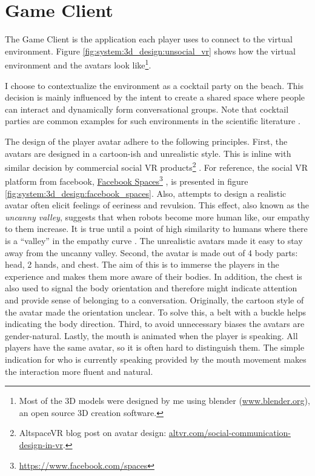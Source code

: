 \documentclass[]{simple-thesis}
\newcommand\fnurl[2]{%
  \href{#2}{#1}\footnote{\url{#2}}%
}
\begin{document}
\section{Game Client}

The Game Client is the application each player uses to connect to the virtual environment.
Figure \ref{fig:system:3d_design:unsocial_vr} shows how the virtual environment and the avatars look like\footnote{Most of the 3D models were designed by me using blender (\href{https://www.blender.org/}{www.blender.org}), an open source 3D creation software.}.

I choose to contextualize the environment as a cocktail party on the beach.
This decision is mainly influenced by the intent to create a shared space where people can interact and dynamically form conversational groups.
Note that cocktail parties are common examples for such environments in the scientific literature \citep{Setti2015}.

The design of the player avatar adhere to the following principles.
First, the avatars are designed in a cartoon-ish and unrealistic style.
This is inline with similar decision by commercial social VR products\footnote{AltspaceVR blog post on avatar design: \href{https://altvr.com/social-communication-design-in-vr/}{altvr.com/social-communication-design-in-vr}.} \citep{Ghosh2017, Pot2016}.
For reference, the social VR platform from facebook, \fnurl{Facebook Spaces}{https://www.facebook.com/spaces}, is presented in figure \ref{fig:system:3d_design:facebook_spaces}.
Also, attempts to design a realistic avatar often elicit feelings of eeriness and revulsion.
This effect, also known as the \textit{uncanny valley}, suggests that when robots become more human like, our empathy to them increase.
It is true until a point of high similarity to humans where there is a ``valley'' in the empathy curve \citep{Mori1970}.
The unrealistic avatars made it easy to stay away from the uncanny valley.
Second, the avatar is made out of 4 body parts: head, 2 hands, and chest.
The aim of this is to immerse the players in the experience and makes them more aware of their bodies.
In addition, the chest is also used to signal the body orientation and therefore might indicate attention and provide sense of belonging to a conversation.
Originally, the cartoon style of the avatar made the orientation unclear.
To solve this, a belt with a buckle helps indicating the body direction.
Third, to avoid unnecessary biases the avatars are gender-natural.
Lastly, the mouth is animated when the player is speaking.
All players have the same avatar, so it is often hard to distinguish them.
The simple indication for who is currently speaking provided by the mouth movement makes the interaction more fluent and natural.
\end{document}
